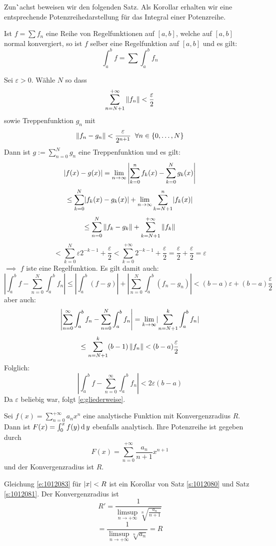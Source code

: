 Zun\``achst beweisen wir den folgenden Satz. Als Korollar erhalten wir eine
entsprechende Potenzreihedarstellung f\"ur das Integral einer Potenzreihe.

\begin{Sat}\label{s:1012081}
  Ist $f=\sum f_n$ eine Reihe von Regelfunktionen auf $[a,b]$, welche auf $[a,b]$ normal konvergiert, so ist $f$ selber eine Regelfunktion auf $[a,b]$ und es gilt:
\begin{equation}\label{e:gliederweise}
\int_a^bf=\sum\int_a^bf_n
 \end{equation}

\end{Sat}
\begin{Bew}
  Sei $\varepsilon>0$. Wähle $N$ so dass
  \[\sum^{+\infty}_{n=N+1}\left\| f_n \right\|<\frac{\varepsilon}{2}\]
  sowie Treppenfunktion $g_n$ mit
  \[\left\| f_n-g_n \right\|<\frac{\varepsilon}{2^{n+1}}\hspace{2mm}\forall n\in\left\{ 0,\dots,N \right\}\]
  Dann ist $g:=\sum_{n=0}^Ng_n$ eine Treppenfunktion und es gilt:
  \[\mathopen| f(x)-g(x) \mathclose|=\displaystyle\lim_{n\rightarrow\infty}\left|\sum_{k=0}^nf_k(x)-\sum^N_{k=0}g_k(x)\right|\]
  \[\leq\sum_{k=0}^N\mathopen| f_k(x)-g_k(x) \mathclose|+\displaystyle\lim_{n\rightarrow\infty}\sum^n_{k=N+1}\mathopen| f_k(x) \mathclose|\]
  \[\leq\sum^N_{n=0}\left\| f_k-g_k \right\|+\sum^{+\infty}_{k=N+1}\left\| f_k \right\|\]
  \[<\sum_{k=0}^N\varepsilon 2^{-k-1}+\frac{\varepsilon}{2}<\sum^{+\infty}_{k=0}2^{-k-1}+\frac{\varepsilon}{2}=\frac{\varepsilon}{2}+\frac{\varepsilon}{2}=\varepsilon\]
  $\implies$ $f$ iste eine Regelfunktion. Es gilt damit auch:
  \[\left|\int_a^bf-\sum^N_{n=0}\int_a^bf_n\right|
 \leq\left|\int_a^b(f-g)\right|+\left|\sum_{n=0}^N\int_a^b(f_n-g_n)\right|
 <(b-a)\varepsilon+(b-a)\frac{\varepsilon}{2}\]
  aber auch:
  \[\left|\sum_{n=0}^\infty\int_a^bf_n-\sum_{n=0}^N\int_a^bf_n\right|
  =\displaystyle\lim_{k\rightarrow\infty}\mathopen| \sum_{n=N+1}^k\int_a^bf_n \mathclose|\]
  \[\leq\sum^k_{n=N+1}(b-1)\left\| f_n \right\| <(b-a)\frac{\varepsilon}{2}\]
  Folglich:
  \[\left|\int_a^bf-\sum_{n=0}^\infty\int_a^bf_n\right|<2\varepsilon(b-a)\]
  Da $\varepsilon$ beliebig war, folgt \eqref{e:gliederweise}.
\end{Bew}
\begin{Kor}
  Sei $f(x)=\sum_{n=0}^{+\infty}a_nx^n$ eine analytische Funktion mit Konvergenzradius $R$. Dann ist $F(x)=\int_0^xf(y)\operatorname{d} y$ ebenfalls analytisch. Ihre Potenzreihe ist gegeben durch
  \begin{equation}\label{e:1012083}
    F(x)=\sum^{+\infty}_{n=0}\frac{a_n}{n+1}x^{n+1}
  \end{equation}
  und der Konvergenzradius ist $R$.
\end{Kor}
\begin{Bew}
  Gleichung \eqref{e:1012083} für $\mathopen| x \mathclose|<R$ ist ein Korollar von Satz \ref{s:1012080} und 
Satz \ref{s:1012081}. Der Konvergenzradius ist
  \[R'=\frac{1}{\limsup_{n\rightarrow+\infty}\sqrt[n]{\frac{a_n}{n+1}}}\]
  \[=\frac{1}{\limsup_{n\rightarrow+\infty}\sqrt[n]{a_n}}=R\]
\end{Bew}

